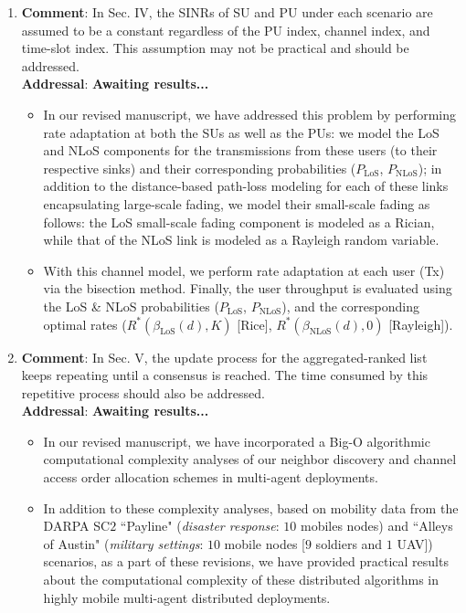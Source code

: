 \documentclass{article}
\begin{document}
\begin{enumerate}
    \item \textbf{Comment}: In Sec. IV,  the SINRs of SU and PU under each scenario are assumed to be a constant regardless of the PU index, channel index, and time-slot index. This assumption may not be practical and should be addressed.\\
    \textbf{Addressal}: \textbf{Awaiting results...} 
    \begin{itemize}
        \item In our revised manuscript, we have addressed this problem by performing rate adaptation at both the SUs as well as the PUs: we model the LoS and NLoS components for the transmissions from these users (to their respective sinks) and their corresponding probabilities ($P_{\text{LoS}}$, $P_{\text{NLoS}}$); in addition to the distance-based path-loss modeling for each of these links encapsulating large-scale fading, we model their small-scale fading as follows: the LoS small-scale fading component is modeled as a Rician, while that of the NLoS link is modeled as a Rayleigh random variable.
        \item With this channel model, we perform rate adaptation at each user (Tx) via the bisection method. Finally, the user throughput is evaluated using the LoS \& NLoS probabilities ($P_{\text{LoS}}$, $P_{\text{NLoS}}$), and the corresponding optimal rates ($R^{*}(\beta_{\text{LoS}}(d),K)$ [Rice], $R^{*}(\beta_{\text{NLoS}}(d),0)$ [Rayleigh]).
    \end{itemize}
    
    \item \textbf{Comment}: In Sec. V, the update process for the aggregated-ranked list keeps repeating until a consensus is reached. The time consumed by this repetitive process should also be addressed.\\
    \textbf{Addressal}: \textbf{Awaiting results...} 
    \begin{itemize}
        \item In our revised manuscript, we have incorporated a Big-O algorithmic computational complexity analyses of our neighbor discovery and channel access order allocation schemes in multi-agent deployments. 
        \item In addition to these complexity analyses, based on mobility data from the DARPA SC$2$ ``Payline" (\textit{disaster response}: $10$ mobiles nodes) and ``Alleys of Austin" (\textit{military settings}: $10$ mobile nodes [$9$ soldiers and $1$ UAV]) scenarios, as a part of these revisions, we have provided practical results about the computational complexity of these distributed algorithms in highly mobile multi-agent distributed deployments.
    \end{itemize}
    

\end{enumerate}
\end{document}

